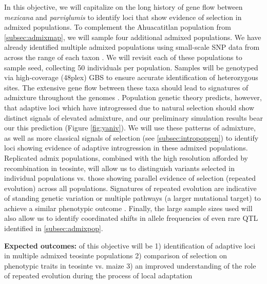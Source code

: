 In this objective, we will capitalize on the long history of gene flow between \emph{mexicana} and \emph{parviglumis} \citep{Ross-Ibarra2009a} to identify loci that show evidence of selection in admixed populations. To complement the Ahuacatitlan population from \ref{subsec:admixmap}, we will sample four additional admixed populations.  We have already identified multiple admixed populations using small-scale SNP data from across the range of each taxon \citep{vanheerwaarden2011a}.  We will revisit each of these populations to sample seed, collecting 50 individuals per population.  Samples will be genotyped via high-coverage (48plex) GBS to ensure accurate identification of heterozygous sites. The extensive gene flow between these taxa should lead to signatures of admixture throughout the genomes \citep{Pyhajarvi2013}.  Population genetic theory predicts, however, that adaptive loci which have introgressed due to natural selection should show distinct signals of elevated admixture, and our preliminary simulation results bear our this prediction (Figure \ref{fig:yaniv}). We will use these patterns of admixture, as well as more classical signals of selection (see \ref{subsec:intropopgen}) to identify loci showing evidence of adaptive introgression in these admixed populations.  Replicated admix populations, combined with the high resolution afforded by recombination in teosinte, will allow us to distinguish variants selected in individual populations vs. those showing parallel evidence of selection (repeated evolution) across all populations.  Signatures of repeated evolution are indicative of standing genetic variation or multiple pathways (a larger mutational target) to achieve a similar phenotypic outcome \citep{Ralph2010a}. Finally, the large sample sizes used will also allow us to identify coordinated shifts in allele frequencies \citet{Berg2013} of even rare QTL identified in \ref{subsec:admixpop}.

{\bf Expected outcomes:} of this objective will be 1) identification of adaptive loci in multiple admixed teosinte populations 2) comparison of selection on phenotypic traits in teosinte vs. maize 3) an improved understanding of the role of repeated evolution during the process of local adaptation 

